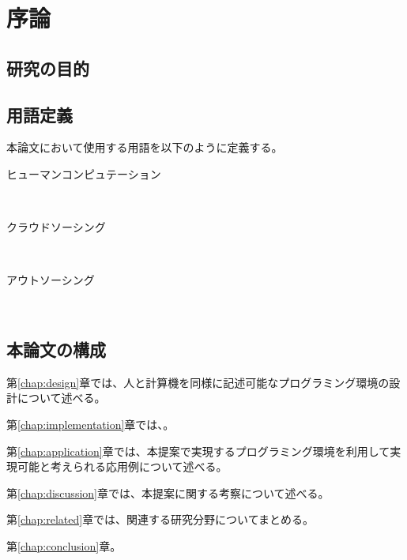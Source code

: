 \chapter{序論}
\label{chap:introduction}

\section{研究の目的}

\section{用語定義}

本論文において使用する用語を以下のように定義する。

\begin{description}
  \item [ヒューマンコンピュテーション] \mbox{}\\
  \item [クラウドソーシング] \mbox{}\\
  \item [アウトソーシング] \mbox{}\\

\end{description}

\section{本論文の構成}

第\ref{chap:design}章では、人と計算機を同様に記述可能なプログラミング環境の設計について述べる。

第\ref{chap:implementation}章では、。

第\ref{chap:application}章では、本提案で実現するプログラミング環境を利用して実現可能と考えられる応用例について述べる。

第\ref{chap:discussion}章では、本提案に関する考察について述べる。

第\ref{chap:related}章では、関連する研究分野についてまとめる。

第\ref{chap:conclusion}章。
